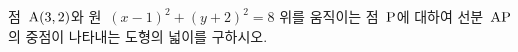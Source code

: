 점~$\mathrm{A}(3{,}\mkern3mu\mathopen{}2)$와 원~$(x-1)^2+(y+2)^2=8$ 위를 움직이는 점~$\mathrm{P}$에 대하여 선분~$\mathrm{AP}$의 중점이 나타내는 도형의 넓이를 구하시오.
